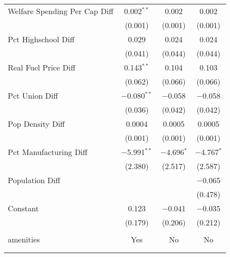 \begin{table}[!htbp]
\begin{tabular}{@{\extracolsep{5pt}}lccc}
  Welfare Spending Per Cap Diff & 0.002$^{**}$ & 0.002 & 0.002 \\ 
  & (0.001) & (0.001) & (0.001) \\ 
  Pct Highschool Diff & 0.029 & 0.024 & 0.024 \\ 
  & (0.041) & (0.044) & (0.044) \\ 
  Real Fuel Price Diff & 0.143$^{**}$ & 0.104 & 0.103 \\ 
  & (0.062) & (0.066) & (0.066) \\ 
  Pct Union Diff & $-$0.080$^{**}$ & $-$0.058 & $-$0.058 \\ 
  & (0.036) & (0.042) & (0.042) \\ 
  Pop Density Diff & 0.0004 & 0.0005 & 0.0005 \\ 
  & (0.001) & (0.001) & (0.001) \\ 
  Pct Manufacturing Diff & $-$5.991$^{**}$ & $-$4.696$^{*}$ & $-$4.767$^{*}$ \\ 
  & (2.380) & (2.517) & (2.587) \\ 
  Population Diff &  &  & $-$0.065 \\ 
  &  &  & (0.478) \\ 
  Constant & 0.123 & $-$0.041 & $-$0.035 \\ 
  & (0.179) & (0.206) & (0.212) \\ 
 \hline \\[-1.8ex] 
amenities & Yes & No & No \\ 
\hline \\[-1.8ex] 
\hline 
\hline \\[-1.8ex] 
\end{tabular} 
\end{table} 
